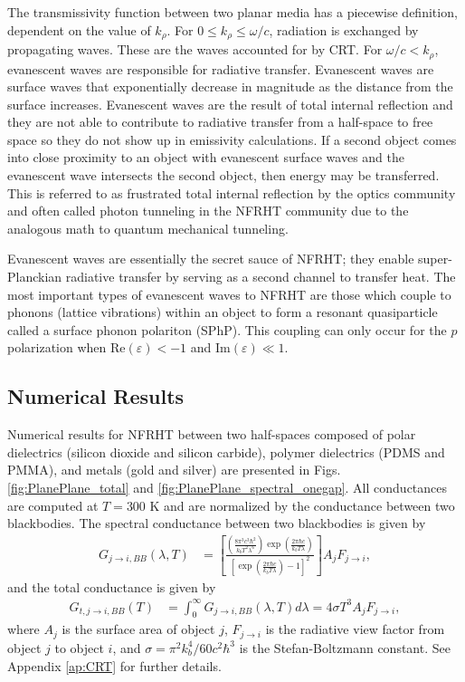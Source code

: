 The transmissivity function between two planar media has a piecewise definition, dependent on the value of $k_{\rho}$. For $0 \le k_{\rho} \le \omega/c$, radiation is exchanged by propagating waves. These are the waves accounted for by CRT. For $\omega/c < k_{\rho}$, evanescent waves are responsible for radiative transfer. Evanescent waves are surface waves that exponentially decrease in magnitude as the distance from the surface increases. Evanescent waves are the result of total internal reflection and they are not able to contribute to radiative transfer from a half-space to free space so they do not show up in emissivity calculations. If a second object comes into close proximity to an object with evanescent surface waves and the evanescent wave intersects the second object, then energy may be transferred. This is referred to as frustrated total internal reflection by the optics community and often called photon tunneling in the NFRHT community due to the analogous math to quantum mechanical tunneling.\cite{Zhu1986}

Evanescent waves are essentially the secret sauce of NFRHT; they enable super-Planckian radiative transfer by serving as a second channel to transfer heat. The most important types of evanescent waves to NFRHT are those which couple to phonons (lattice vibrations) within an object to form a resonant quasiparticle called a surface phonon polariton (SPhP).\cite{Mirlin1982} This coupling can only occur for the $p$ polarization when $\mathrm{Re}(\varepsilon) < -1$ and $\mathrm{Im}(\varepsilon) \ll 1$.\cite{Petersen2013}


\subsection{Numerical Results}
%
Numerical results for NFRHT between two half-spaces composed of polar dielectrics (silicon dioxide and silicon carbide), polymer dielectrics (PDMS and PMMA), and metals (gold and silver) are presented in Figs. \ref{fig:PlanePlane_total} and \ref{fig:PlanePlane_spectral_onegap}. All conductances are computed at $T = 300$ \si{\kelvin} and are normalized by the conductance between two blackbodies. The spectral conductance between two blackbodies is given by
%
\begin{align} \label{eq:SpecCond_BB}
G_{j \rightarrow i,BB}(\lambda, T) &= \left[ \frac{ \left( \frac{8 \pi^{3} c^{3} \hbar^{2}}{k_{b} T^{2} \lambda^{6}} \right) \exp{\left( \frac{2 \pi \hbar c}{k_{b} T \lambda} \right)} }{ \left[ \exp{\left( \frac{2 \pi \hbar c}{k_{b} T \lambda} \right)} - 1 \right]^{2} } \right] A_{j} F_{j \rightarrow i},
\end{align}
%
and the total conductance is given by
%
\begin{align} \label{eq:TotalCond_BB}
G_{t,j \rightarrow i,BB}(T) &= \int_{0}^{\infty} G_{j \rightarrow i,BB}(\lambda, T) d\lambda = 4 \sigma T^{3} A_{j} F_{j \rightarrow i},
\end{align}
%
where $A_{j}$ is the surface area of object $j$, $F_{j \rightarrow i}$ is the radiative view factor from object $j$ to object $i$, and $\sigma=\pi^{2} k_{b}^{4}/60c^{2}\hbar^{3}$ is the Stefan-Boltzmann constant. See Appendix \ref{ap:CRT} for further details.

